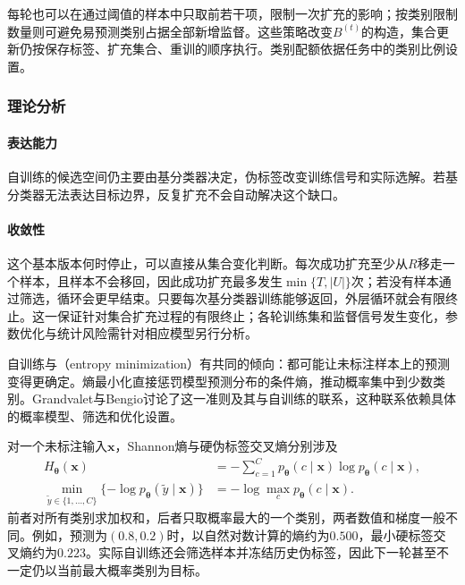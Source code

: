每轮也可以在通过阈值的样本中只取前若干项，限制一次扩充的影响；按类别限制数量则可避免易预测类别占据全部新增监督。这些策略改变$B^{(t)}$的构造，集合更新仍按保存标签、扩充集合、重训的顺序执行。类别配额依据任务中的类别比例设置。

\subsubsection{理论分析}
\label{sec:classification-self-training-analysis}

\paragraph{表达能力}
自训练的候选空间仍主要由基分类器决定，伪标签改变训练信号和实际选解。若基分类器无法表达目标边界，反复扩充不会自动解决这个缺口。

\paragraph{收敛性}
这个基本版本何时停止，可以直接从集合变化判断。每次成功扩充至少从$R$移走一个样本，且样本不会移回，因此成功扩充最多发生$\min\{T,|U|\}$次；若没有样本通过筛选，循环会更早结束。只要每次基分类器训练能够返回，外层循环就会有限终止。这一保证针对集合扩充过程的有限终止；各轮训练集和监督信号发生变化，参数优化与统计风险需针对相应模型另行分析。

自训练与（entropy minimization）有共同的倾向：都可能让未标注样本上的预测变得更确定。熵最小化直接惩罚模型预测分布的条件熵，推动概率集中到少数类别。Grandvalet与Bengio讨论了这一准则及其与自训练的联系，这种联系依赖具体的概率模型、筛选和优化设置。

对一个未标注输入$\bm{x}$，Shannon熵与硬伪标签交叉熵分别涉及
\begin{equation}
  \label{eq:classification-pseudolabel-entropy}
  \begin{aligned}
    H_{\bm{\theta}}(\bm{x})
      &=-\sum_{c=1}^{C}p_{\bm{\theta}}(c\mid\bm{x})
        \log p_{\bm{\theta}}(c\mid\bm{x}),\\
    \min_{\widetilde y\in\{1,\dots,C\}}
      \{-\log p_{\bm{\theta}}(\widetilde y\mid\bm{x})\}
      &=-\log\max_c p_{\bm{\theta}}(c\mid\bm{x}).
  \end{aligned}
\end{equation}
前者对所有类别求加权和，后者只取概率最大的一个类别，两者数值和梯度一般不同。例如，预测为$(0.8,0.2)$时，以自然对数计算的熵约为$0.500$，最小硬标签交叉熵约为$0.223$。实际自训练还会筛选样本并冻结历史伪标签，因此下一轮甚至不一定仍以当前最大概率类别为目标。

